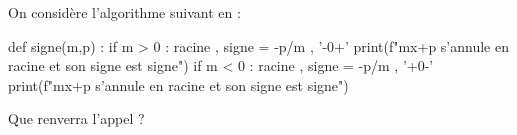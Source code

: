 \documentclass[a4paper,11pt]{article}
\begin{document}
\medskip


\medskip

On considère l'algorithme suivant en \calgpython{} :

\begin{tcpythoncode}[15cm]
	\begin{pyverbatim}[][fontsize=\footnotesize,numbers=left,numbersep=10pt]
		def signe(m,p) :
			if m > 0 :
				racine , signe = -p/m , '-0+'
				print(f"mx+p s'annule en {racine} et son signe est {signe}")
			if m < 0 :
				racine , signe = -p/m , '+0-'
				print(f"mx+p s'annule en {racine} et son signe est {signe}")
	\end{pyverbatim}
\end{tcpythoncode}

Que renverra l'appel  ?
\end{document}
